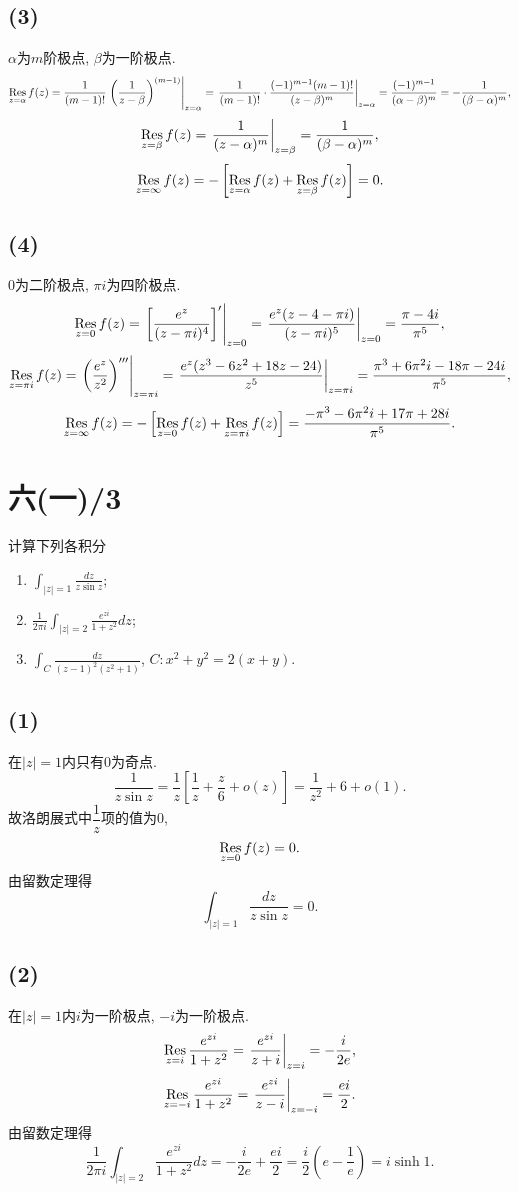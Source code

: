 \documentclass[11pt,a4paper]{article}
\newcommand{\res}[1]{\mathop{\Res}\limits_{#1}}
\begin{document}
\subsection*{(3)}
$\alpha$为$m$阶极点, $\beta$为一阶极点.
$$\res{z=\alpha}f(z)=\frac{1}{(m-1)!}\left.\left(\frac{1}{z-\beta}\right)^{(m-1)}\right|_{z=\alpha}=\left.\frac{1}{(m-1)!}\cdot\frac{(-1)^{m-1}(m-1)!}{(z-\beta)^m}\right|_{z=\alpha}=\frac{(-1)^{m-1}}{(\alpha-\beta)^m}=-\frac{1}{(\beta-\alpha)^m},$$
$$\res{z=\beta}f(z)=\left.\frac{1}{(z-\alpha)^m}\right|_{z=\beta}=\frac{1}{(\beta-\alpha)^m},$$
$$\res{z=\infty}f(z)=-\left[\res{z=\alpha}f(z)+\res{z=\beta}f(z)\right]=0.$$

\subsection*{(4)}
0为二阶极点, $\pi i$为四阶极点.
$$\res{z=0}f(z)=\left.\left[\frac{e^z}{(z-\pi i)^4}\right]'\right|_{z=0}=\left.\frac{e^z(z-4-\pi i)}{(z-\pi i)^5}\right|_{z=0}=\frac{\pi-4i}{\pi^5},$$
$$\res{z=\pi i}f(z)=\left.\left(\frac{e^z}{z^2}\right)'''\right|_{z=\pi i}=\left.\frac{e^z(z^3-6z^2+18z-24)}{z^5}\right|_{z=\pi i}=\frac{\pi^3+6\pi^2i-18\pi-24i}{\pi^5},$$
$$\res{z=\infty}f(z)=-\left[\res{z=0}f(z)+\res{z=\pi i}f(z)\right]=\frac{-\pi^3-6\pi^2i+17\pi+28i}{\pi^5}.$$

\section{六(一)/3}
\begin{problem}
计算下列各积分
\begin{enumerate}
  \item $\displaystyle\int_{|z|=1}\frac{dz}{z\sin z}$;
  \item $\displaystyle\frac{1}{2\pi i}\int_{|z|=2}\frac{e^{zi}}{1+z^2}dz$;
  \item $\displaystyle\int_C\frac{dz}{(z-1)^2(z^2+1)}$, $C:x^2+y^2=2(x+y)$.
\end{enumerate}
\end{problem}
\subsection*{(1)}
在$|z|=1$内只有0为奇点.
$$\frac{1}{z\sin z}=\frac{1}{z}\left[\frac{1}{z}+\frac{z}{6}+o(z)\right]=\frac{1}{z^2}+6+o(1).$$
故洛朗展式中$\dfrac{1}{z}$项的值为0,
$$\res{z=0}f(z)=0.$$
由留数定理得
$$\int_{|z|=1}\frac{dz}{z\sin z}=0.$$

\subsection*{(2)}
在$|z|=1$内$i$为一阶极点, $-i$为一阶极点.
$$\res{z=i}\frac{e^{zi}}{1+z^2}=\left.\frac{e^{zi}}{z+i}\right|_{z=i}=-\frac{i}{2e},$$
$$\res{z=-i}\frac{e^{zi}}{1+z^2}=\left.\frac{e^{zi}}{z-i}\right|_{z=-i}=\frac{ei}{2}.$$
由留数定理得
$$\frac{1}{2\pi i}\int_{|z|=2}\frac{e^{zi}}{1+z^2}dz=-\frac{i}{2e}+\frac{ei}{2}=\frac{i}{2}\left(e-\frac{1}{e}\right)=i\sinh1.$$
\end{document}
